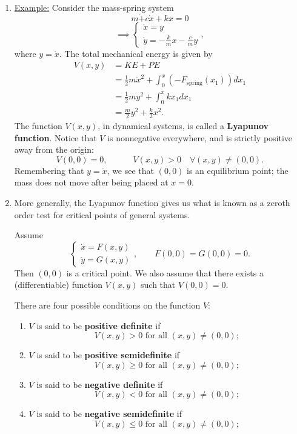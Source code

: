 \documentclass[11pt, letterpaper, oneside]{article}     %
\numberwithin{equation}{subsection}
\theoremstyle{definition}
\numberwithin{theorem}{section}
\theoremstyle{remark}
\begin{document}
\begin{enumerate}

\item \underline{Example:} Consider the mass-spring system
  \begin{equation}
    m\ddot  + c\dot x + kx = 0
  \end{equation}
  \begin{equation}
    \implies \begin{cases}
      \dot x = y\\
      \dot y = - \frac{k}{m}x - \frac{c}{m}y
    \end{cases},
  \end{equation}
  where $y = \dot x$.
  The total mechanical energy is given by
  \begin{align}
    V(x,y) &= KE + PE\\
    &= \frac{1}{2}m\dot x^2 + \int_0^x(-F_{\text{spring}}(x_1))dx_1\\
    &= \frac{1}{2}my^2 + \int_0^xkx_1dx_1\\
    &= \frac{m}{2}y^2 + \frac{k}{2}x^2.
  \end{align}
  The function $V(x,y)$, in dynamical systems, is called a \textbf{Lyapunov function}. Notice that $V$ is nonnegative everywhere, and is strictly positive away from the origin:
  \begin{equation}
    V(0,0) = 0,\quad\quad\quad
    V(x,y) > 0 \quad\forall (x,y) \neq (0,0).
  \end{equation}
  Remembering that $y = \dot x$, we see that $(0,0)$ is an equilibrium point; the mass does not move after being placed at $x = 0$.

\item More generally, the Lyapunov function gives us what is known as a zeroth order test for critical points of general systems.

  Assume
  \begin{equation}
    \begin{cases}
      \dot x = F(x,y)\\
      \dot y = G(x,y)
    \end{cases},
    \quad\quad F(0,0) = G(0,0) = 0.
  \end{equation}
  Then $(0,0)$ is a critical point. We also assume that there exists a (differentiable) function $V(x,y)$ such that $V(0,0) = 0$.

  There are four possible conditions on the function $V$:
  \begin{enumerate}
  \item $V$ is said to be \textbf{positive definite} if $$V(x,y) > 0\text{ for all }(x,y) \neq (0,0);$$
  \item $V$ is said to be \textbf{positive semidefinite} if $$V(x,y) \geq 0\text{ for all }(x,y) \neq (0,0);$$
  \item $V$ is said to be \textbf{negative definite} if $$V(x,y) < 0\text{ for all }(x,y) \neq (0,0);$$
  \item $V$ is said to be \textbf{negative semidefinite} if $$V(x,y) \leq 0\text{ for all }(x,y) \neq (0,0);$$
  \end{enumerate}


\end{enumerate}
\end{document}
